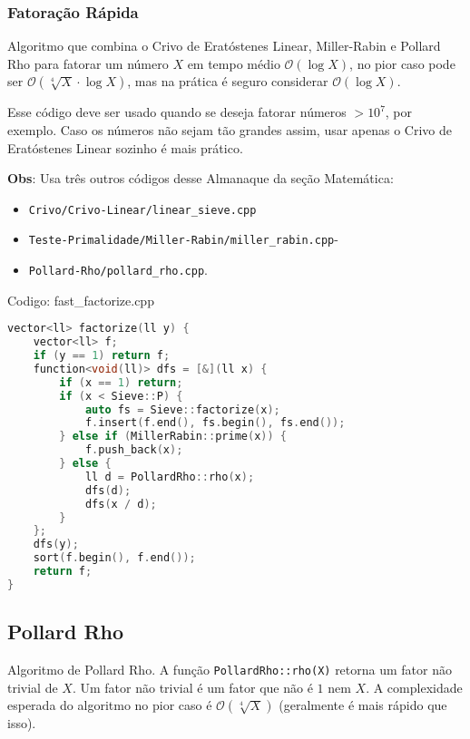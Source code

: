\documentclass[10pt, a4paper, oneside]{book}
\begin{document}
\subsubsection{Fatoração Rápida}


Algoritmo que combina o Crivo de Eratóstenes Linear, Miller-Rabin e Pollard Rho para fatorar um número $X$ em tempo médio $\mathcal{O}(\log X)$, no pior caso pode ser $\mathcal{O}(\sqrt[4]{X} \cdot \log X)$, mas na prática é seguro considerar $\mathcal{O}(\log X)$.



Esse código deve ser usado quando se deseja fatorar números $> 10^7$, por exemplo. Caso os números não sejam tão grandes assim, usar apenas o Crivo de Eratóstenes Linear sozinho é mais prático.



\textbf{Obs}: Usa três outros códigos desse Almanaque da seção Matemática:

\begin{itemize}
\item \texttt{Crivo/Crivo-Linear/linear\_sieve.cpp}
\item \texttt{Teste-Primalidade/Miller-Rabin/miller\_rabin.cpp}-
\item \texttt{Pollard-Rho/pollard\_rho.cpp}.
\end{itemize}

\hfill

Codigo: fast\_factorize.cpp

\begin{lstlisting}[language=C++]
vector<ll> factorize(ll y) {
    vector<ll> f;
    if (y == 1) return f;
    function<void(ll)> dfs = [&](ll x) {
        if (x == 1) return;
        if (x < Sieve::P) {
            auto fs = Sieve::factorize(x);
            f.insert(f.end(), fs.begin(), fs.end());
        } else if (MillerRabin::prime(x)) {
            f.push_back(x);
        } else {
            ll d = PollardRho::rho(x);
            dfs(d);
            dfs(x / d);
        }
    };
    dfs(y);
    sort(f.begin(), f.end());
    return f;
}\end{lstlisting}
\hfill

\subsection{Pollard Rho}


Algoritmo de Pollard Rho. A função \texttt{PollardRho::rho(X)} retorna um fator não trivial de $X$. Um fator não trivial é um fator que não é $1$ nem $X$. A complexidade esperada do algoritmo no pior caso é $\mathcal{O}(\sqrt[4]{X})$ (geralmente é mais rápido que isso).
\end{document}
